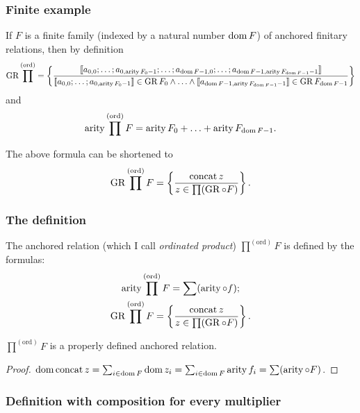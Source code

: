 \subsubsection{Finite example}

If $F$ is a finite family (indexed by a natural number $\operatorname{dom} F$)
of anchored finitary relations, then by definition \[
\operatorname{GR}\prod^\mathrm{(ord)} =
\left\{ \frac{
\llbracket a_{0, 0} ; \ldots ; a_{0, \operatorname{arity} F_0 - 1} ; \ldots ; a_{\operatorname{dom} F - 1, 0} ; \ldots ; a_{\operatorname{dom} F - 1, \operatorname{arity} F_{\operatorname{dom} F - 1} - 1} \rrbracket
}{
\llbracket a_{0, 0} ; \ldots ; a_{0, \operatorname{arity} F_0 - 1} \rrbracket \in \operatorname{GR} F_0 \land \ldots \land \llbracket a_{\operatorname{dom} F - 1, \operatorname{arity} F_{\operatorname{dom} F - 1} - 1} \rrbracket \in \operatorname{GR} F_{\operatorname{dom} F - 1}
}\right\}
\]and 
\[
\operatorname{arity}\prod^{\mathrm{(ord)}}F=\operatorname{arity} F_{0}+\ldots+\operatorname{arity} F_{\operatorname{dom} F-1}.
\]


The above formula can be shortened to
\[
\operatorname{GR}\prod^{\mathrm{(ord)}}F=\left\{ \frac{\operatorname{concat} z}{z\in\prod(\operatorname{GR}\circ F)}\right\}.
\]



\subsubsection{The definition}
\begin{defn}
The anchored relation (which I call \emph{ordinated
product}) $\prod^{\mathrm{(ord)}}F$ is defined by the formulas:
\begin{gather*}
\operatorname{arity}\prod^{\mathrm{(ord)}}F=\sum(\operatorname{arity}\circ f);\\
\operatorname{GR}\prod^{\mathrm{(ord)}}F=\left\{ \frac{\operatorname{concat} z}{z\in\prod(\operatorname{GR}\circ F)}\right\}.
\end{gather*}
\end{defn}
\begin{prop}
$\prod^{\mathrm{(ord)}}F$ is a properly defined anchored relation.\end{prop}
\begin{proof}
$\operatorname{dom}\operatorname{concat} z=\sum_{i\in\operatorname{dom} F}\operatorname{dom} z_{i}=\sum_{i\in\operatorname{dom} F}\operatorname{arity} f_{i}=\sum(\operatorname{arity}\circ F)$.
\end{proof}

\subsubsection{Definition with composition for every multiplier}

